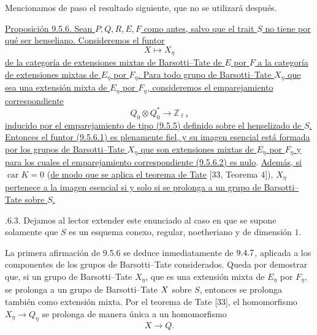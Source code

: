 
Mencionamos de paso el resultado siguiente, que no se utilizará después.

\medskip
\noindent
\underline{Proposición 9.5.6. Sean $P,Q,R,E,F$ como antes, salvo que el
trait $S$ no tiene por qué ser henseliano. Consideremos el funtor}
\begin{equation}\tag{9.5.6.1}
 X\longmapsto X_\eta
\end{equation}
\underline{de la categoría de extensiones mixtas de Barsotti--Tate de
$E$ por $F$ a la categoría de extensiones mixtas de $E_\eta$ por
$F_\eta$. Para todo grupo de Barsotti--Tate $X_\eta$ que sea una
extensión mixta de $E_\eta$ por $F_\eta$, consideremos el
emparejamiento correspondiente}
\begin{equation}\tag{9.5.6.2}
 Q_0\otimes Q_0^*\longrightarrow\mathbb Z_{\ell s}
\end{equation}
\underline{inducido por el emparejamiento de tipo (9.5.5) definido
sobre el henselizado de $S$. Entonces el funtor (9.5.6.1) es plenamente
fiel, y su imagen esencial está formada por los grupos de
Barsotti--Tate $X_\eta$ que son extensiones mixtas de $E_\eta$ por
$F_\eta$ y para los cuales el emparejamiento correspondiente (9.5.6.2)
es nulo}. \underline{Además, si $\operatorname{car}K=0$} (\underline{de modo que se aplica el
teorema de Tate} [33, Teorema 4]), \underline{$X_\eta$ pertenece a la imagen esencial
si y solo si se prolonga a un grupo de Barsotti--Tate sobre $S$.}

\medskip
{}.6.3. Dejamos al lector extender este enunciado al caso en que se
supone solamente que $S$ es un esquema conexo, regular, noetheriano y de
dimensión $1$.

La primera afirmación de 9.5.6 se deduce inmediatamente de
$\sisi{9.4.6}{9.4.7}$, aplicada a los componentes de los grupos de
Barsotti--Tate considerados. Queda por demostrar que, si un grupo de
Barsotti--Tate $X_\eta$, que es una extensión mixta de $E_\eta$ por
$F_\eta$, se prolonga a un grupo de Barsotti--Tate
$\sisi{X_\eta}{X}$ sobre $S$, entonces se prolonga también como extensión
mixta. Por el teorema de Tate [33], el homomorfismo
$X_\eta\longrightarrow Q_\eta$ se prolonga de manera única a un
homomorfismo
\begin{equation*}
 X\longrightarrow Q.
\end{equation*}


